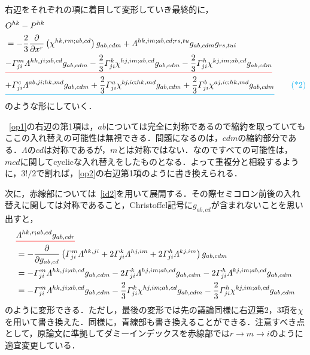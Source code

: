 \documentclass[main]{subfiles}
\begin{document}
右辺をそれぞれの項に着目して変形していき最終的に，
\begin{align*}
    &O^{hk}-P^{hk} \\
    &= - \dfrac{2}{3} \dfrac{\partial }{\partial x^r }\left( \chi ^{hk,rm;ab,cd} \right) g_{ab,cdm} 
    + \varLambda^{hk,im;ab,cd;rs,tu} g_{ab,cdm}g_{rs,tui}  \\
    &\color{red}{\underline{\textcolor{black}{-
        \varGamma^m_{ji} \varLambda^{hk,ji;ab,cd}g_{ab,cdm} -\dfrac{2}{3}\varGamma^k_{ji}
    \chi ^{hj,im;ab,cd} g_{ab,cdm} - \dfrac{2}{3}\varGamma^h_{ji}\chi ^{kj,im;ab,cd} g_{ab,cdm}}}} \\
    &\color{cyan}{\underline{\textcolor{black}{+
        \varGamma^c_{ji} \varLambda^{ab,ji;hk,md}g_{ab,cdm} + \dfrac{2}{3}\varGamma^a_{ji}\chi ^{bj,ic;hk,md} g_{ab,cdm} + \dfrac{2}{3}\varGamma^b_{ji}\chi ^{aj,ic;hk,md} g_{ab,cdm}}}}
    \label{op2} \tag{*2}
\end{align*}
のような形にしていく．

~\eqref{op1}の右辺の第1項は，\(ab\)については完全に対称であるので縮約を取っていてもここの入れ替えの可能性は無視できる．問題になるのは，\(cdm\)の縮約部分である．\(\Lambda\)の\(cd\)は対称であるが，\(m\)とは対称ではない．なのですべての可能性は，\(mcd\)に関してcyclicな入れ替えをしたものとなる．よって重複分と相殺するように，\(3!/2\)で割れば，\eqref{op2}の右辺第1項のように書き換えられる．

次に，赤線部については~\eqref{id2}を用いて展開する．その際セミコロン前後の入れ替えに関しては対称であること，Christoffel記号に\(g_{ab,cd}\)が含まれないことを思い出すと，
\begin{align*}
    &\color{red}{\underline{\textcolor{black}{\varLambda^{hk,r;ab,cd} g_{ab,cdr}}}} \\
    &=- \dfrac{\partial }{\partial g_{ab,cd} } 
    \left( 
        \varGamma^m_{ji} \varLambda^{hk,ji} + 2\varGamma^k_{ji} \varLambda^{hj,im} 
        + 2\varGamma^h_{ji}\varLambda^{kj,im}
    \right) g_{ab,cdm}\\
    &= - \varGamma^m_{ji} \varLambda^{hk,ji;ab,cd}g_{ab,cdm} -2\varGamma^k_{ji}
    \varLambda^{hj,im;ab,cd} g_{ab,cdm} - 2\varGamma^h_{ji}\varLambda^{kj,im;ab,cd} g_{ab,cdm}\\
    &= - \varGamma^m_{ji} \varLambda^{hk,ji;ab,cd}g_{ab,cdm} -\dfrac{2}{3}\varGamma^k_{ji}
    \chi^{hj,im;ab,cd} g_{ab,cdm} - \dfrac{2}{3}\varGamma^h_{ji}\chi^{kj,im;ab,cd} g_{ab,cdm}
\end{align*}
のように変形できる．ただし，最後の変形では先の議論同様に右辺第2，3項を\(\chi\)を用いて書き換えた．同様に，青線部も書き換えることができる．注意すべき点として，原論文に準拠してダミーインデックスを赤線部では\(r \rightarrow m \rightarrow i\)のように適宜変更している．
\end{document}
